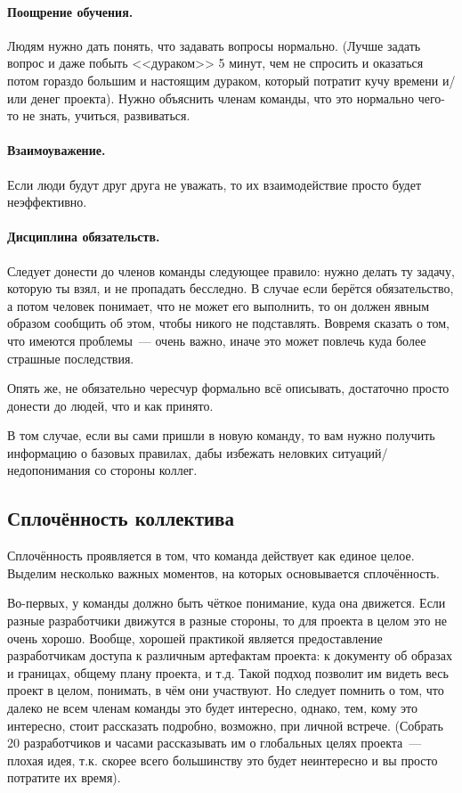 \documentclass{../../text-style}
\begin{document}
\paragraph*{Поощрение обучения.} Людям нужно дать понять, что задавать вопросы нормально. (Лучше задать вопрос и даже побыть <<дураком>> 5 минут, чем не спросить и оказаться потом гораздо большим и настоящим дураком, который потратит кучу времени и/или денег проекта). Нужно объяснить членам команды, что это нормально чего-то не знать, учиться, развиваться.

\paragraph*{Взаимоуважение.} Если люди будут друг друга не уважать, то их взаимодействие просто будет неэффективно.

\paragraph*{Дисциплина обязательств.} Следует донести до членов команды следующее правило: нужно делать ту задачу, которую ты взял, и не пропадать бесследно. В случае если берётся обязательство, а потом человек понимает, что не может его выполнить, то он должен явным образом сообщить об этом, чтобы никого не подставлять. Вовремя сказать о том, что имеются проблемы~--- очень важно, иначе это может повлечь куда более страшные последствия.

Опять же, не обязательно чересчур формально всё описывать, достаточно просто донести до людей, что и как принято.

В том случае, если вы сами пришли в новую команду, то вам нужно получить информацию о базовых правилах, дабы избежать неловких ситуаций/недопонимания со стороны коллег. 

\subsection{Сплочённость коллектива}

Сплочённость проявляется в том, что команда действует как единое целое. Выделим несколько важных моментов, на которых основывается сплочённость.

Во-первых, у команды должно быть чёткое понимание, куда она движется. Если разные разработчики движутся в разные стороны, то для проекта в целом это не очень хорошо. Вообще, хорошей практикой является предоставление разработчикам доступа к различным артефактам проекта: к документу об образах и границах, общему плану проекта, и т.д. Такой подход позволит им видеть весь проект в целом, понимать, в чём они участвуют. Но следует помнить о том, что далеко не всем членам команды это будет интересно, однако, тем, кому это интересно, стоит рассказать подробно, возможно, при личной встрече. (Собрать 20 разработчиков и часами рассказывать им о глобальных целях проекта~--- плохая идея, т.к. скорее всего большинству это будет неинтересно и вы просто потратите их время).
\end{document}
